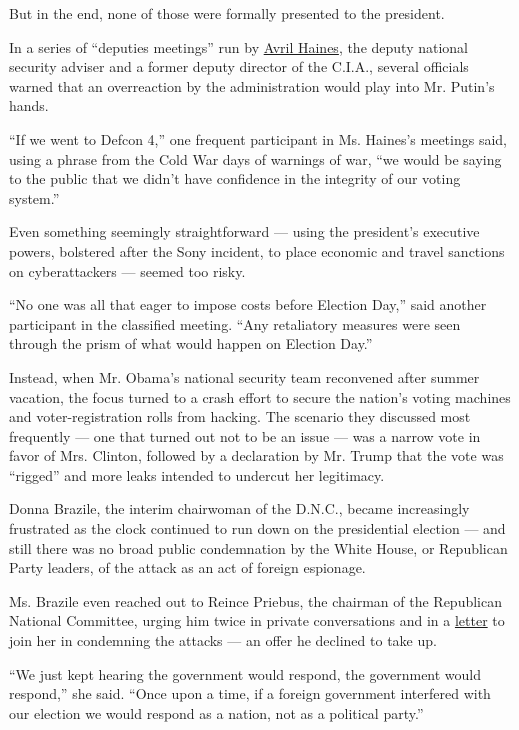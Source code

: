 But in the end, none of those were formally presented to the president.

In a series of ``deputies meetings'' run by
\href{https://www.whitehouse.gov/the-press-office/2014/12/18/statement-president-selection-avril-haines-deputy-national-security-advi}{Avril
Haines}, the deputy national security adviser and a former deputy
director of the C.I.A., several officials warned that an overreaction by
the administration would play into Mr. Putin's hands.

``If we went to Defcon 4,'' one frequent participant in Ms. Haines's
meetings said, using a phrase from the Cold War days of warnings of war,
``we would be saying to the public that we didn't have confidence in the
integrity of our voting system.''

Even something seemingly straightforward --- using the president's
executive powers, bolstered after the Sony incident, to place economic
and travel sanctions on cyberattackers --- seemed too risky.

``No one was all that eager to impose costs before Election Day,'' said
another participant in the classified meeting. ``Any retaliatory
measures were seen through the prism of what would happen on Election
Day.''

Instead, when Mr. Obama's national security team reconvened after summer
vacation, the focus turned to a crash effort to secure the nation's
voting machines and voter-registration rolls from hacking. The scenario
they discussed most frequently --- one that turned out not to be an
issue --- was a narrow vote in favor of Mrs. Clinton, followed by a
declaration by Mr. Trump that the vote was ``rigged'' and more leaks
intended to undercut her legitimacy.

Donna Brazile, the interim chairwoman of the D.N.C., became increasingly
frustrated as the clock continued to run down on the presidential
election --- and still there was no broad public condemnation by the
White House, or Republican Party leaders, of the attack as an act of
foreign espionage.

Ms. Brazile even reached out to Reince Priebus, the chairman of the
Republican National Committee, urging him twice in private conversations
and in a
\href{https://www.documentcloud.org/documents/3237225-2016-10-18-DNC-RNC-Letter.html}{letter}
to join her in condemning the attacks --- an offer he declined to take
up.

``We just kept hearing the government would respond, the government
would respond,'' she said. ``Once upon a time, if a foreign government
interfered with our election we would respond as a nation, not as a
political party.''

